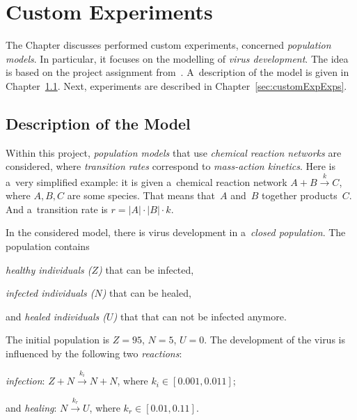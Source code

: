 \documentclass[a4paper, 11pt]{article}
\theoremstyle{definition}
\begin{document}
\section{Custom Experiments}
\label{sec:customExp}

The Chapter discusses performed custom experiments, concerned
\emph{population models}. In particular, it focuses on the modelling of
\emph{virus development}. The idea is based on the project assignment
from~\cite{mbaCeska}. A~description of the model is given in
Chapter~\ref{sec:customExpModel}. Next, experiments are described in
Chapter~\ref{sec:customExpExps}.

\subsection{Description of the Model}
\label{sec:customExpModel}

Within this project, \emph{population models} that use \emph{chemical
reaction networks} are considered, where \emph{transition rates}
correspond to \emph{mass-action kinetics}. Here is a~very simplified
example: it is given a~chemical reaction network $ A + B
\xrightarrow{k} C $, where $ A, B, C $ are some species. That means
that~$ A $ and~$ B $ together products~$ C $. And a~transition rate
is $ r = |A| \cdot |B| \cdot k $.

In the considered model, there is virus development in a~\emph{closed
population}. The population contains
\begin{enumerate*}[label={(\roman*)}]
    \item
        \emph{healthy individuals ($ Z $)} that can be infected,

    \item
        \emph{infected individuals ($ N $)} that can be healed,

    \item
        and \emph{healed individuals ($ U $)} that that can not be
        infected anymore.
\end{enumerate*}
The initial population is $ Z = 95 $, $ N = 5 $, $ U = 0 $. The
development of the virus is influenced by the following two
\emph{reactions}:
\begin{enumerate*}[label={(\roman*)}]
    \item
        \emph{infection}: $ Z + N \xrightarrow{k_i} N + N $, where
        $ k_i \in [0.001, 0.011] $;

    \item
        and \emph{healing}: $ N \xrightarrow{k_r} U $, where $ k_r \in
        [0.01, 0.11] $.
\end{enumerate*}
\end{document}
